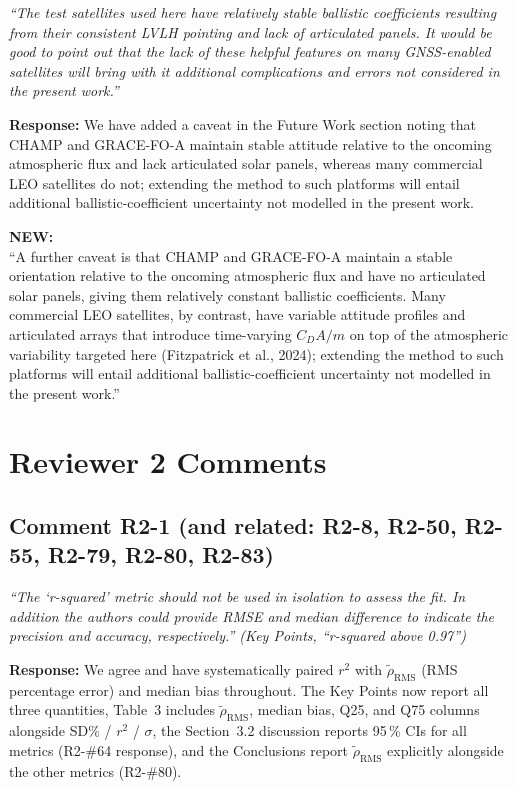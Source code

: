 \documentclass[11pt]{article}
\newcommand{\reviewercomment}[1]{%
  \medskip
  \noindent\textit{\color{reviewblue}#1}%
  \medskip
}
\newcommand{\newtext}[1]{%
  \smallskip
  \noindent\hspace{1em}\begin{minipage}{0.92\textwidth}%
  \color{quotegreen}\textbf{NEW:}\\[2pt]``#1''%
  \end{minipage}%
  \smallskip
}
\begin{document}
\reviewercomment{%
``The test satellites used here have relatively stable ballistic coefficients
resulting from their consistent LVLH pointing and lack of articulated panels.
It would be good to point out that the lack of these helpful features on
many GNSS-enabled satellites will bring with it additional complications
and errors not considered in the present work.''}

\textbf{Response:}
We have added a caveat in the Future Work section noting that CHAMP and
GRACE-FO-A maintain stable attitude relative to the oncoming atmospheric
flux and lack articulated solar panels, whereas many commercial LEO satellites do not; extending the method to such platforms
will entail additional ballistic-coefficient uncertainty not modelled
in the present work.

\newtext{A further caveat is that CHAMP and GRACE-FO-A maintain a stable orientation relative to the oncoming atmospheric flux and have no articulated solar panels, giving them relatively constant ballistic coefficients. Many commercial LEO satellites, by contrast, have variable attitude profiles and articulated arrays that introduce time-varying $C_{D}A/m$ on top of the atmospheric variability targeted here (Fitzpatrick et al., 2024); extending the method to such platforms will entail additional ballistic-coefficient uncertainty not modelled in the present work.}


\section{Reviewer 2 Comments}

\subsection{Comment R2-1 (and related: R2-8, R2-50, R2-55, R2-79, R2-80, R2-83)}

\reviewercomment{%
``The `r-squared' metric should not be used in isolation to assess the fit.
In addition the authors could provide RMSE and median difference to
indicate the precision and accuracy, respectively.'' (Key Points,
``r-squared above 0.97'')}

\textbf{Response:}
We agree and have systematically paired $r^{2}$ with $\tilde{\rho}_{\mathrm{RMS}}$
(RMS percentage error) and median bias throughout. The Key Points now
report all three quantities, Table~3 includes $\tilde{\rho}_{\mathrm{RMS}}$,
median bias, Q25, and Q75 columns alongside SD\% / $r^{2}$ / $\sigma$, the
Section~3.2 discussion reports 95\,\% CIs for all metrics
(R2-\#64 response), and the Conclusions report $\tilde{\rho}_{\mathrm{RMS}}$
explicitly alongside the other metrics (R2-\#80).
\end{document}
